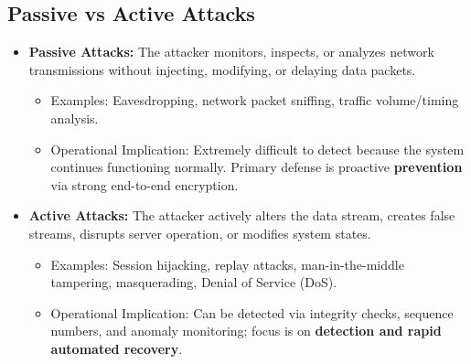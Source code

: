 \subsection{Passive vs Active Attacks}
\begin{itemize}[leftmargin=*]
  \item \textbf{Passive Attacks:} The attacker monitors, inspects, or analyzes network transmissions without injecting, modifying, or delaying data packets.
    \begin{itemize}
      \item Examples: Eavesdropping, network packet sniffing, traffic volume/timing analysis.
      \item Operational Implication: Extremely difficult to detect because the system continues functioning normally. Primary defense is proactive \textbf{prevention} via strong end-to-end encryption.
    \end{itemize}
  \item \textbf{Active Attacks:} The attacker actively alters the data stream, creates false streams, disrupts server operation, or modifies system states.
    \begin{itemize}
      \item Examples: Session hijacking, replay attacks, man-in-the-middle tampering, masquerading, Denial of Service (DoS).
      \item Operational Implication: Can be detected via integrity checks, sequence numbers, and anomaly monitoring; focus is on \textbf{detection and rapid automated recovery}.
    \end{itemize}
\end{itemize}

